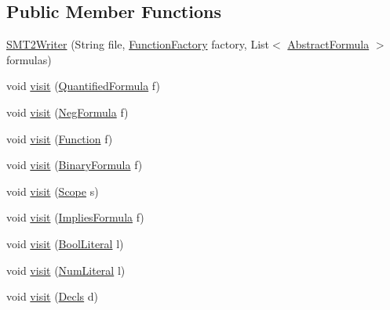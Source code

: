 \subsection*{Public Member Functions}
\begin{DoxyCompactItemize}
\item 
\hyperlink{classuran_1_1formula_1_1smt2_1_1_s_m_t2_writer_a88904339a24bd533f5584860c77dcd2c}{S\+M\+T2\+Writer} (String file, \hyperlink{classuran_1_1formula_1_1_function_factory}{Function\+Factory} factory, List$<$ \hyperlink{classuran_1_1formula_1_1_abstract_formula}{Abstract\+Formula} $>$ formulas)
\item 
void \hyperlink{classuran_1_1formula_1_1smt2_1_1_s_m_t2_writer_a906653c10ec017aa9560738515f19846}{visit} (\hyperlink{classuran_1_1formula_1_1_quantified_formula}{Quantified\+Formula} f)
\item 
void \hyperlink{classuran_1_1formula_1_1smt2_1_1_s_m_t2_writer_ac866ec17559eb4fda18aafe214b8c34d}{visit} (\hyperlink{classuran_1_1formula_1_1_neg_formula}{Neg\+Formula} f)
\item 
void \hyperlink{classuran_1_1formula_1_1smt2_1_1_s_m_t2_writer_a8ed1938909ef546cf8dcefb26a13bb97}{visit} (\hyperlink{classuran_1_1formula_1_1_function}{Function} f)
\item 
void \hyperlink{classuran_1_1formula_1_1smt2_1_1_s_m_t2_writer_ac8d84346356ba5b81a1ae45bd692f1f4}{visit} (\hyperlink{classuran_1_1formula_1_1_binary_formula}{Binary\+Formula} f)
\item 
void \hyperlink{classuran_1_1formula_1_1smt2_1_1_s_m_t2_writer_a2a77824c71d9cf186466b156fba8d3a5}{visit} (\hyperlink{classuran_1_1formula_1_1_scope}{Scope} s)
\item 
void \hyperlink{classuran_1_1formula_1_1smt2_1_1_s_m_t2_writer_ae14821d642dc18335d0715b90e261498}{visit} (\hyperlink{classuran_1_1formula_1_1_implies_formula}{Implies\+Formula} f)
\item 
void \hyperlink{classuran_1_1formula_1_1smt2_1_1_s_m_t2_writer_a3f2743ff714b3fc21b8d6a47a3ebad77}{visit} (\hyperlink{classuran_1_1formula_1_1_bool_literal}{Bool\+Literal} l)
\item 
void \hyperlink{classuran_1_1formula_1_1smt2_1_1_s_m_t2_writer_a71234b258fdd457d72f56ce875846cf0}{visit} (\hyperlink{classuran_1_1formula_1_1_num_literal}{Num\+Literal} l)
\item 
void \hyperlink{classuran_1_1formula_1_1smt2_1_1_s_m_t2_writer_a316277942b83d5782d061445a2538f71}{visit} (\hyperlink{classuran_1_1formula_1_1_decls}{Decls} d)
\item 

\end{DoxyCompactItemize}
